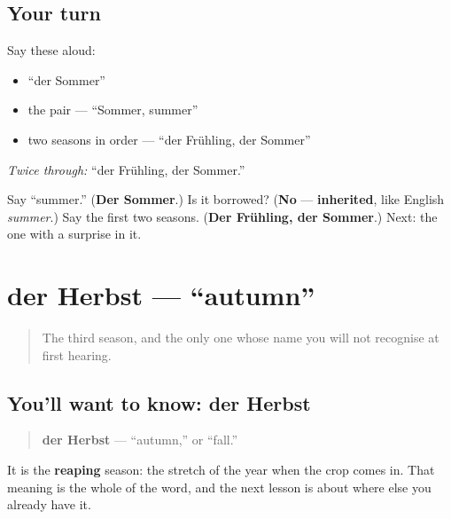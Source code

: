 \subsection*{Your turn}
Say these aloud:

\begin{itemize}
\raggedright
  \item \textquotedblleft{}der Sommer\textquotedblright{}
  \item the pair — \textquotedblleft{}Sommer, summer\textquotedblright{}
  \item two seasons in order — \textquotedblleft{}der Frühling, der Sommer\textquotedblright{}
\end{itemize}

\emph{Twice through:} \textquotedblleft{}der Frühling, der Sommer.\textquotedblright{}

\begin{tcolorbox}[breakable,colback=teal!4,colframe=teal!35!black,title={Before you move on}]
Say \textquotedblleft{}summer.\textquotedblright{} (\textbf{Der Sommer}.) Is it borrowed? (\textbf{No} — \textbf{inherited}, like English \emph{summer}.) Say the first two seasons. (\textbf{Der Frühling, der Sommer}.) Next: the one with a surprise in it.
\end{tcolorbox}
\section[der Herbst]{der Herbst — \textquotedblleft{}autumn\textquotedblright{}}

\label{lesson:GE-C09-herbst}



\begin{quote}
The third season, and the only one whose name you will not recognise at first hearing.
\end{quote}

\subsection*{You'll want to know: der Herbst}
\begin{quote}
\textbf{der Herbst} — \textquotedblleft{}autumn,\textquotedblright{} or \textquotedblleft{}fall.\textquotedblright{}
\end{quote}

It is the \textbf{reaping} season: the stretch of the year when the crop comes in. That meaning is the whole of the word, and the next lesson is about where else you already have it.

